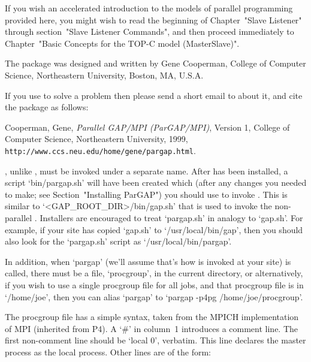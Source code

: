If you wish  an  accelerated  introduction  to  the  models  of  parallel
programming provided here, you  might  wish  to  read  the  beginning  of
Chapter~"Slave Listener" through section~"Slave Listener  Commands",  and
then proceed immediately to Chapter~"Basic Concepts for the  TOP-C  model
(MasterSlave)".


The {\ParGAP} package was designed and written by Gene Cooperman, College
of Computer Science, Northeastern University, Boston, MA, U.S.A.

If you use {\ParGAP} to solve a problem then please send a short email to
 about it, and cite  the  {\ParGAP}  package  as
follows:

\begintt
{}
      Cooperman, Gene,
      {\sl Parallel GAP/MPI (ParGAP/MPI)}, Version 1,
      College of Computer Science, Northeastern University, 1999,
      \verb+http://www.ccs.neu.edu/home/gene/pargap.html+.
\endtt


{\ParGAP}, unlike {\GAP}, must be invoked under a  separate  name.  After
{\ParGAP} has been installed, a script  `bin/pargap.sh'  will  have  been
created  which   (after   any   changes   you   needed   to   make;   see
Section~"Installing ParGAP") you should use to invoke {\ParGAP}. This  is
similar  to  `<GAP_ROOT_DIR>/bin/gap.sh'  that  is  used  to  invoke  the
non-parallel {\GAP}. Installers are encouraged to  treat  `pargap.sh'  in
analogy to `gap.sh'. For example, if your site  has  copied  `gap.sh'  to
`/usr/local/bin/gap', then you  should  also  look  for  the  `pargap.sh'
script as `/usr/local/bin/pargap'.

In addition, when `pargap' (we'll assume that's how {\ParGAP} is  invoked
at your site) is called, there  must  be  a  file,  `procgroup',  in  the
current directory,  or  alternatively,  if  you  wish  to  use  a  single
procgroup file for all jobs, and that procgroup file is  in  `/home/joe',
then you can alias `pargap' to `pargap -p4pg /home/joe/procgroup'.

The  procgroup  file  has  a  simple  syntax,  taken   from   the   MPICH
implementation of MPI (inherited from P4). A `\#' in column~1  introduces
a comment line. The first non-comment line should be `local 0', verbatim.
This line declares the master process as the local process.  Other  lines
are of the form:

